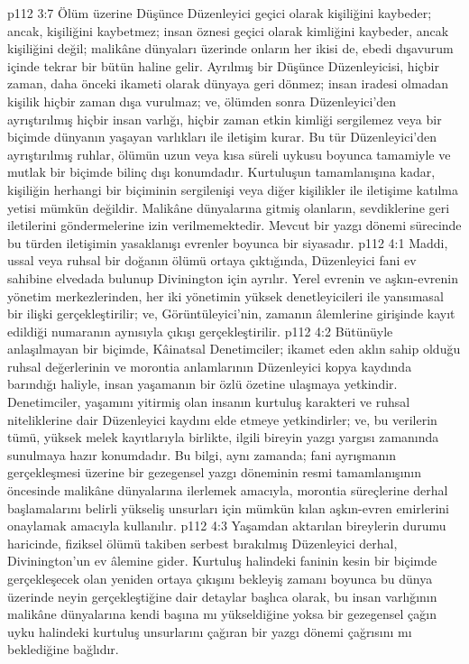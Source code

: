 \vs p112 3:7 Ölüm üzerine Düşünce Düzenleyici geçici olarak kişiliğini kaybeder; ancak, kişiliğini kaybetmez; insan öznesi geçici olarak kimliğini kaybeder, ancak kişiliğini değil; malikâne dünyaları üzerinde onların her ikisi de, ebedi dışavurum içinde tekrar bir bütün haline gelir. Ayrılmış bir Düşünce Düzenleyicisi, hiçbir zaman, daha önceki ikameti olarak dünyaya geri dönmez; insan iradesi olmadan kişilik hiçbir zaman dışa vurulmaz; ve, ölümden sonra Düzenleyici’den ayrıştırılmış hiçbir insan varlığı, hiçbir zaman etkin kimliği sergilemez veya bir biçimde dünyanın yaşayan varlıkları ile iletişim kurar. Bu tür Düzenleyici’den ayrıştırılmış ruhlar, ölümün uzun veya kısa süreli uykusu boyunca tamamiyle ve mutlak bir biçimde bilinç dışı konumdadır. Kurtuluşun tamamlanışına kadar, kişiliğin herhangi bir biçiminin sergilenişi veya diğer kişilikler ile iletişime katılma yetisi mümkün değildir. Malikâne dünyalarına gitmiş olanların, sevdiklerine geri iletilerini göndermelerine izin verilmemektedir. Mevcut bir yazgı dönemi sürecinde bu türden iletişimin yasaklanışı evrenler boyunca bir siyasadır.
\vs p112 4:1 Maddi, ussal veya ruhsal bir doğanın ölümü ortaya çıktığında, Düzenleyici fani ev sahibine elvedada bulunup Divinington için ayrılır. Yerel evrenin ve aşkın\hyp{}evrenin yönetim merkezlerinden, her iki yönetimin yüksek denetleyicileri ile yansımasal bir ilişki gerçekleştirilir; ve, Görüntüleyici’nin, zamanın âlemlerine girişinde kayıt edildiği numaranın aynısıyla çıkışı gerçekleştirilir.
\vs p112 4:2 Bütünüyle anlaşılmayan bir biçimde, Kâinatsal Denetimciler; ikamet eden aklın sahip olduğu ruhsal değerlerinin ve morontia anlamlarının Düzenleyici kopya kaydında barındığı haliyle, insan yaşamanın bir özlü özetine ulaşmaya yetkindir. Denetimciler, yaşamını yitirmiş olan insanın kurtuluş karakteri ve ruhsal niteliklerine dair Düzenleyici kaydını elde etmeye yetkindirler; ve, bu verilerin tümü, yüksek melek kayıtlarıyla birlikte, ilgili bireyin yazgı yargısı zamanında sunulmaya hazır konumdadır. Bu bilgi, aynı zamanda; fani ayrışmanın gerçekleşmesi üzerine bir gezegensel yazgı döneminin resmi tamamlanışının öncesinde malikâne dünyalarına ilerlemek amacıyla, morontia süreçlerine derhal başlamalarını belirli yükseliş unsurları için mümkün kılan aşkın\hyp{}evren emirlerini onaylamak amacıyla kullanılır.
\vs p112 4:3 Yaşamdan aktarılan bireylerin durumu haricinde, fiziksel ölümü takiben serbest bırakılmış Düzenleyici derhal, Divinington’un ev âlemine gider. Kurtuluş halindeki faninin kesin bir biçimde gerçekleşecek olan yeniden ortaya çıkışını bekleyiş zamanı boyunca bu dünya üzerinde neyin gerçekleştiğine dair detaylar başlıca olarak, bu insan varlığının malikâne dünyalarına kendi başına mı yükseldiğine yoksa bir gezegensel çağın uyku halindeki kurtuluş unsurlarını çağıran bir yazgı dönemi çağrısını mı beklediğine bağlıdır.
